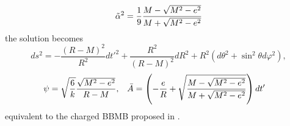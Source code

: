 \begin{equation}
    \Tilde{\alpha}^2 = \frac{1}{9}\frac{M - \sqrt{M^2-e^2}}{M + \sqrt{M^2-e^2}}
\end{equation}
the solution becomes
\begin{equation}
    ds^2=-\frac{(R-M)^2}{R^2}dt'^2 + \frac{R^2}{(R-M)^2} dR^2 + R^2(d\theta^2 + \sin^2\theta d\varphi^2),
    \label{bbmb + trasf V) in forma normale}
\end{equation}
\begin{align}
      \psi &=\sqrt{\frac{6}{k}}\frac{\sqrt{M^2-e^2}}{R-M}, & \bar{A} &= \left( -\frac{e}{R} + \sqrt{\frac{M - \sqrt{M^2-e^2}}{M + \sqrt{M^2-e^2}}}\right) dt' \notag
\end{align}
equivalent to the charged BBMB proposed in \citep{embedding}.

